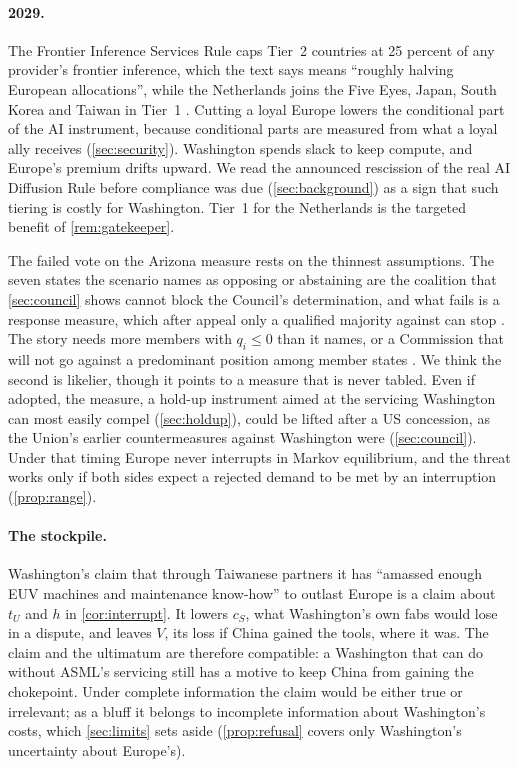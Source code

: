 \paragraph{2029.} The Frontier Inference Services Rule caps Tier~2 countries at 25 percent of any provider's frontier inference, which the text says means ``roughly halving European allocations'', while the Netherlands joins the Five Eyes, Japan, South Korea and Taiwan in Tier~1 \citep{juijn2026europe}. Cutting a loyal Europe lowers the conditional part of the AI instrument, because conditional parts are measured from what a loyal ally receives (\cref{sec:security}). Washington spends slack to keep compute, and Europe's premium drifts upward. We read the announced rescission of the real AI Diffusion Rule before compliance was due (\cref{sec:background}) as a sign that such tiering is costly for Washington. Tier~1 for the Netherlands is the targeted benefit of \cref{rem:gatekeeper}.

The failed vote on the Arizona measure rests on the thinnest assumptions. The seven states the scenario names as opposing or abstaining are the coalition that \cref{sec:council} shows cannot block the Council's determination, and what fails is a response measure, which after appeal only a qualified majority against can stop \citep{eu2023aci, eu2011comitology}. The story needs more members with $q_i\le 0$ than it names, or a Commission that will not go against a predominant position among member states \citep{commission2023acistatement}. We think the second is likelier, though it points to a measure that is never tabled. Even if adopted, the measure, a hold-up instrument aimed at the servicing Washington can most easily compel (\cref{sec:holdup}), could be lifted after a US concession, as the Union's earlier countermeasures against Washington were (\cref{sec:council}). Under that timing Europe never interrupts in Markov equilibrium, and the threat works only if both sides expect a rejected demand to be met by an interruption (\cref{prop:range}).

\paragraph{The stockpile.} Washington's claim that through Taiwanese partners it has ``amassed enough EUV machines and maintenance know-how'' to outlast Europe \citep{juijn2026europe} is a claim about $t_U$ and $h$ in \cref{cor:interrupt}. It lowers $c_S$, what Washington's own fabs would lose in a dispute, and leaves $V$, its loss if China gained the tools, where it was. The claim and the ultimatum are therefore compatible: a Washington that can do without ASML's servicing still has a motive to keep China from gaining the chokepoint. Under complete information the claim would be either true or irrelevant; as a bluff it belongs to incomplete information about Washington's costs, which \cref{sec:limits} sets aside (\cref{prop:refusal} covers only Washington's uncertainty about Europe's).

